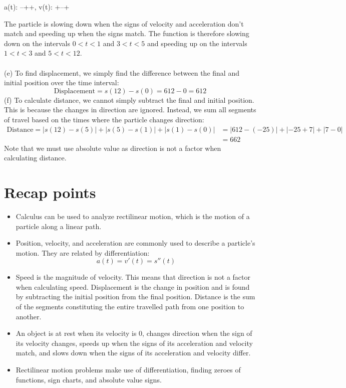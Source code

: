\documentclass[11pt]{scrartcl}
\begin{document}
\def\sgchartD#1#2,{\ifx\relax#1\else\hbox to\tcolw{\hss$#1#2$\hss}\expandafter\sgchartD\fi}
\def\sgchartE#1#2,{\ifx\relax#1\else
    \ifx~#1\sgchartS\tcolw\circ \else\sgchartS\tcolw\bullet\fi \expandafter\sgchartE\fi}
\def\sgchartR{\leaders\vrule height2.8pt depth-2.4pt\hfil}
\def\sgchartS#1#2{\hbox to#1{\kern-.2pt\sgchartR \ifx\relax#2\else
   \kern-.7pt$#2$\kern-.7pt\sgchartR\fi\kern-.2pt}}
\ecatcode
\begin{center}
  {a(t): --++, v(t): +--+}
\end{center}
The particle is slowing down when the signs of velocity and acceleration don't match and speeding up when the signs match. The function is therefore slowing down on the intervals $0 < t <1$ and $3 < t <5$ and speeding up on the intervals $1 < t <3$ and $5 < t < 12$. \\
\\
\noindent 
(e) To find displacement, we simply find the difference between the final and initial position over the time interval: 
$$\text{Displacement}=s(12)-s(0)=612-0=612$$
\noindent 
(f) To calculate distance, we cannot simply subtract the final and initial position. This is because the changes in direction are ignored. Instead, we sum all segments of travel based on the times where the particle changes direction: 
\begin{align*}
    \text{Distance}=\lvert s(12)-s(5)\rvert + \lvert s(5)-s(1) \rvert + \lvert s(1)-s(0) \rvert &=\lvert 612-(-25) \rvert + \lvert -25+7 \rvert + \lvert 7-0 \rvert \\
           &=662
\end{align*}
Note that we must use absolute value as direction is not a factor when calculating distance. 
\section{Recap points}
\begin{itemize}
    \item Calculus can be used to analyze rectilinear motion, which is the motion of a particle along a linear path. 
    \item Position, velocity, and acceleration are commonly used to describe a particle's motion. They are related by differentiation: 
    $$a(t)=v'(t)=s''(t)$$
    \item Speed is the magnitude of velocity. This means that direction is not a factor when calculating speed. Displacement is the change in position and is found by subtracting the initial position from the final position. Distance is the sum of the segments constituting the entire travelled path from one position to another. 
    \item An object is at rest when its velocity is 0, changes direction when the sign of its velocity changes, speeds up when the signs of its acceleration and velocity match, and slows down when the signs of its acceleration and velocity differ. 
    \item Rectilinear motion problems make use of differentiation, finding zeroes of functions, sign charts, and absolute value signs. 
\end{itemize}
\end{document}
